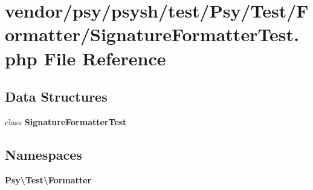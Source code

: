\section{vendor/psy/psysh/test/\+Psy/\+Test/\+Formatter/\+Signature\+Formatter\+Test.php File Reference}
\label{_signature_formatter_test_8php}
\subsection*{Data Structures}
\begin{DoxyCompactItemize}
\item 
class {\bf Signature\+Formatter\+Test}
\end{DoxyCompactItemize}
\subsection*{Namespaces}
\begin{DoxyCompactItemize}
\item 
 {\bf Psy\textbackslash{}\+Test\textbackslash{}\+Formatter}
\end{DoxyCompactItemize}
